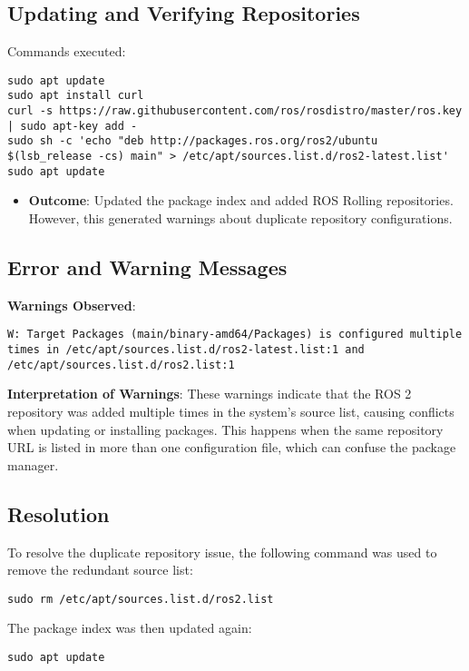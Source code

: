 \documentclass{article}
\begin{document}
\subsection*{Updating and Verifying Repositories}
Commands executed:
\begin{verbatim}
sudo apt update
sudo apt install curl
curl -s https://raw.githubusercontent.com/ros/rosdistro/master/ros.key | sudo apt-key add -
sudo sh -c 'echo "deb http://packages.ros.org/ros2/ubuntu $(lsb_release -cs) main" > /etc/apt/sources.list.d/ros2-latest.list'
sudo apt update
\end{verbatim}

\begin{itemize}
    \item \textbf{Outcome}: Updated the package index and added ROS Rolling repositories. However, this generated warnings about duplicate repository configurations.
\end{itemize}

\subsection*{Error and Warning Messages}
\textbf{Warnings Observed}:
\begin{verbatim}
W: Target Packages (main/binary-amd64/Packages) is configured multiple times in /etc/apt/sources.list.d/ros2-latest.list:1 and /etc/apt/sources.list.d/ros2.list:1
\end{verbatim}

\textbf{Interpretation of Warnings}: These warnings indicate that the ROS 2 repository was added multiple times in the system’s source list, causing conflicts when updating or installing packages. This happens when the same repository URL is listed in more than one configuration file, which can confuse the package manager.

\subsection*{Resolution}
To resolve the duplicate repository issue, the following command was used to remove the redundant source list:
\begin{verbatim}
sudo rm /etc/apt/sources.list.d/ros2.list
\end{verbatim}

The package index was then updated again:
\begin{verbatim}
sudo apt update
\end{verbatim}
\end{document}
